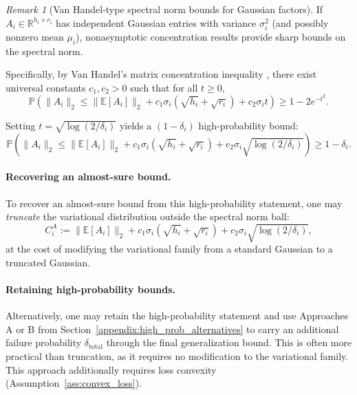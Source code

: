 \documentclass{article}
\theoremstyle{plain}
\theoremstyle{definition}
\theoremstyle{remark}
\newtheorem{remark}[theorem]{Remark}
\begin{document}
\begin{remark}[Van Handel-type spectral norm bounds for Gaussian factors]
\label{rem:van_handel}
If $A_i \in \mathbb{R}^{h_i \times r_i}$ has independent Gaussian entries with variance $\sigma_i^2$ (and possibly nonzero mean $\mu_i$), nonasymptotic concentration results provide sharp bounds on the spectral norm.

Specifically, by Van Handel's matrix concentration inequality \citep{van2017spectral}, there exist universal constants $c_1, c_2 > 0$ such that for all $t \geq 0$,
\[
\mathbb{P}\!\left(
\|A_i\|_2
\leq
\|\mathbb{E}[A_i]\|_2 + c_1\sigma_i(\sqrt{h_i}+\sqrt{r_i}) + c_2\sigma_i t
\right)
\geq 1-2e^{-t^2}.
\]

Setting $t = \sqrt{\log(2/\delta_i)}$ yields a $(1-\delta_i)$ high-probability bound:
\[
\mathbb{P}\!\left(
\|A_i\|_2
\leq
\|\mathbb{E}[A_i]\|_2 + c_1\sigma_i(\sqrt{h_i}+\sqrt{r_i}) + c_2\sigma_i \sqrt{\log(2/\delta_i)}
\right)
\geq 1-\delta_i.
\]

\paragraph{Recovering an almost-sure bound.} To recover an almost-sure bound from this high-probability statement, one may \emph{truncate} the variational distribution outside the spectral norm ball:
\[
C_i^A := \|\mathbb{E}[A_i]\|_2 + c_1\sigma_i(\sqrt{h_i}+\sqrt{r_i}) + c_2\sigma_i \sqrt{\log(2/\delta_i)},
\]
at the cost of modifying the variational family from a standard Gaussian to a truncated Gaussian.

\paragraph{Retaining high-probability bounds.} Alternatively, one may retain the high-probability statement and use Approaches A or B from Section~\ref{appendix:high_prob_alternatives} to carry an additional failure probability $\delta_{\text{total}}$ through the final generalization bound. This is often more practical than truncation, as it requires no modification to the variational family. This approach additionally requires loss convexity (Assumption~\ref{ass:convex_loss}).


\end{remark}
\end{document}

